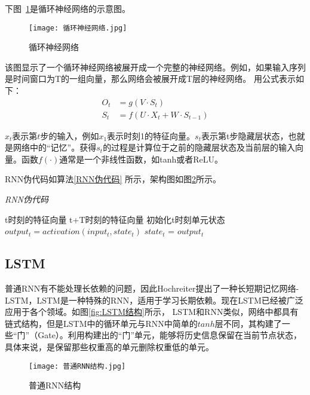 下图~\ref{fig:循环神经网络}是循环神经网络的示意图\cite{rnn-structure}。
\begin{figure}
    \centering
    \texttt{[image: 循环神经网络.jpg]}
    \caption{循环神经网络}
    \label{fig:循环神经网络}
  \end{figure}
该图显示了一个循环神经网络被展开成一个完整的神经网络。例如，如果输入序列是时间窗口为T的一组向量，那么网络会被展开成T层的神经网络。
  用公式表示如下：
  \begin{equation}
      \begin{aligned}
          O_t &= g(V\cdot S_t) \\
          S_t &= f(U\cdot X_t + W\cdot S_{t-1})
      \end{aligned}
  \end{equation}

  $x_t$表示第$t$步的输入，例如$x_1$表示时刻1的特征向量。$s_t$表示第t步隐藏层状态，也就是网络中的“记忆”。获得$s_t$的过程是计算位于之前的隐藏层状态及当前层的输入向量。函数$f(\cdot)$通常是一个非线性函数，如tanh或者ReLU。

RNN伪代码如算法\ref{RNN伪代码} 所示，架构图如图\ref{fig:普通RNN结构}所示\cite{rnn-structure}。
  \begin{algorithm}[!h]
    \caption{\emph{RNN伪代码}}
    \label{RNN伪代码}
    \begin{algorithmic}[1]
      \Require t时刻的特征向量
      \Ensure t+T时刻的特征向量
      \State 初始化t时刻单元状态
        \State $output_t = activation(input_t, state_t)$
        \State $state_t$ = $output_t$
      \EndFor
    \end{algorithmic}
  \end{algorithm}

\subsection{LSTM}
普通RNN有不能处理长依赖的问题，因此Hochreiter提出了一种长短期记忆网络-LSTM，LSTM是一种特殊的RNN，适用于学习长期依赖。现在LSTM已经被广泛应用于各个领域。如图\ref{fig:LSTM结构}所示\cite{rnn-structure}， LSTM和RNN类似，网络中都具有链式结构，但是LSTM中的循环单元与RNN中简单的$tanh$层不同，其构建了一些“门”（Gate）。利用构建出的“门”单元，能够将历史信息保留在当前节点状态，具体来说，是保留那些权重高的单元删除权重低的单元。

\begin{figure}
    \centering
    \texttt{[image: 普通RNN结构.jpg]}
    \caption{普通RNN结构}
    \label{fig:普通RNN结构}
  \end{figure}

